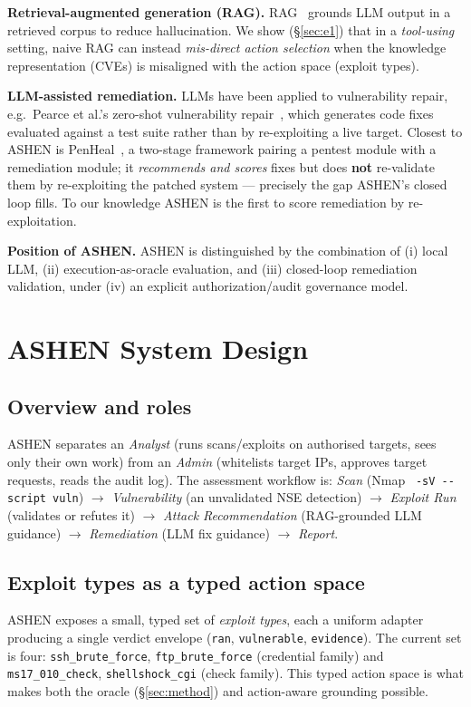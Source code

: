 \documentclass[conference]{IEEEtran}
\newcommand{\code}[1]{\texttt{#1}}
\begin{document}
\textbf{Retrieval-augmented generation (RAG).} RAG~\cite{rag} grounds LLM output
in a retrieved corpus to reduce hallucination. We show
(\S\ref{sec:e1}) that in a \emph{tool-using} setting, naive RAG can instead
\emph{mis-direct action selection} when the knowledge representation (CVEs) is
misaligned with the action space (exploit types).

\textbf{LLM-assisted remediation.} LLMs have been applied to vulnerability
repair, e.g.\ Pearce et al.'s zero-shot vulnerability repair~\cite{pearce}, which
generates code fixes evaluated against a test suite rather than by re-exploiting a
live target. Closest to ASHEN is PenHeal~\cite{penheal}, a two-stage framework
pairing a pentest module with a remediation module; it \emph{recommends and
scores} fixes but does \textbf{not} re-validate them by re-exploiting the patched
system --- precisely the gap ASHEN's closed loop fills. To our knowledge ASHEN is
the first to score remediation by re-exploitation.

\textbf{Position of ASHEN.} ASHEN is distinguished by the combination of (i)
local LLM, (ii) execution-as-oracle evaluation, and (iii) closed-loop remediation
validation, under (iv) an explicit authorization/audit governance model.

\section{ASHEN System Design}\label{sec:design}
\subsection{Overview and roles}
ASHEN separates an \emph{Analyst} (runs scans/exploits on authorised targets,
sees only their own work) from an \emph{Admin} (whitelists target IPs, approves
target requests, reads the audit log). The assessment workflow is: \emph{Scan}
(Nmap~\cite{nmap} \code{-sV -{}-script vuln}) $\rightarrow$ \emph{Vulnerability} (an
unvalidated NSE detection) $\rightarrow$ \emph{Exploit Run} (validates or refutes
it) $\rightarrow$ \emph{Attack Recommendation} (RAG-grounded LLM guidance)
$\rightarrow$ \emph{Remediation} (LLM fix guidance) $\rightarrow$ \emph{Report}.

\subsection{Exploit types as a typed action space}
ASHEN exposes a small, typed set of \emph{exploit types}, each a uniform adapter
producing a single verdict envelope (\code{ran}, \code{vulnerable},
\code{evidence}). The current set is four: \code{ssh\_brute\_force},
\code{ftp\_brute\_force} (credential family) and \code{ms17\_010\_check},
\code{shellshock\_cgi} (check family). This typed action space is what makes both
the oracle (\S\ref{sec:method}) and action-aware grounding possible.
\end{document}
